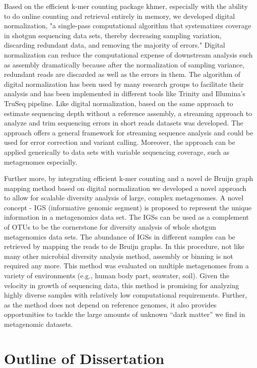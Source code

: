 Based on the efficient k-mer counting package khmer, especially with the ability
to do online counting and retrieval entirely in memory, we developed digital
normalization\cite{Brown2012}, "a single-pass computational algorithm that systematizes
coverage in shotgun sequencing data sets, thereby decreasing sampling 
variation, discarding redundant data, and removing the majority of errors." 
Digital normalization can reduce the computational expense of downstream analysis
such as assembly dramatically because after the normalization of sampling variance,
redundant reads are discarded as well as the errors in 
them. The algorithm of digital
normalization has been used by many research groups to facilitate their
analysis and has been implemented in different tools like Trinity and 
Illumina's TruSeq pipeline. Like digital normalization, based on the same
approach to estimate sequencing depth without a reference assembly, a streaming
approach to analyze and trim sequencing errors in short reads datasets was
developed\cite{zhang2015crossing}. The approach offers a general framework for streaming sequence
analysis and could be used for error correction and variant calling. Moreover,
the approach can be applied generically to data sets with variable sequencing
coverage, such as metagenomes especially.

Further more, by integrating efficient k-mer counting and a novel de Bruijn
graph mapping method based on digital normalization we developed a novel
approach to allow for scalable diversity analysis of large, complex
metagenomes.  A novel concept - IGS (informative genomic segment) is proposed
to represent the unique information in a metagenomics data set. The IGSs can be
used as a complement of OTUs to be the cornerstone for diversity analysis of
whole shotgun metagenomics data sets. The abundance of IGSs in different
samples can be retrieved by mapping the reads to de Bruijn graphs. In this
procedure, not like many other microbial diversity analysis method, assembly or
binning is not required any more. This method was evaluated on multiple
metagenomes from a variety of environments (e.g., human body part, seawater,
soil). Given the velocity in growth of sequencing data, this method is
promising for analyzing highly diverse samples with relatively low
computational requirements. Further, as the method does not depend on reference
genomes, it also provides opportunities to tackle the large amounts of unknown
``dark matter'' we find in metagenomic datasets.


\section{Outline of Dissertation}

